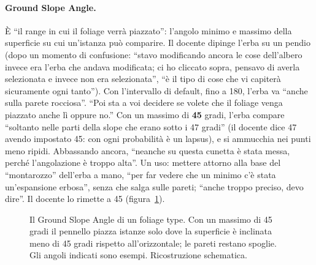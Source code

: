 \paragraph{Ground Slope Angle.} È ``il range in cui il foliage verrà piazzato'': l'angolo
minimo e massimo della superficie su cui un'istanza può comparire. Il docente dipinge l'erba
su un pendio (dopo un momento di confusione: ``stavo modificando ancora le cose dell'albero
invece era l'erba che andava modificata; ci ho cliccato sopra, pensavo di averla selezionata e
invece non era selezionata'', ``è il tipo di cose che vi capiterà sicuramente ogni tanto''). Con
l'intervallo di default, fino a 180, l'erba va ``anche sulla parete rocciosa''. ``Poi sta a voi
decidere se volete che il foliage venga piazzato anche lì oppure no.'' Con un massimo di
\textbf{45} gradi, l'erba compare ``soltanto nelle parti della slope che erano sotto i 47
gradi'' (il docente dice 47 avendo impostato 45: con ogni probabilità è un lapsus), e si
ammucchia nei punti meno ripidi. Abbassando ancora, ``neanche su questa cunetta è stata
messa, perché l'angolazione è troppo alta''. Un uso: mettere attorno alla base del
``montarozzo'' dell'erba a mano, ``per far vedere che un minimo c'è stata un'espansione
erbosa'', senza che salga sulle pareti; ``anche troppo preciso, devo dire''. Il docente lo
rimette a 45 (figura~\ref{ue15:fig:slope}).

\begin{figure}[htbp]
\centering
{}
\caption{Il Ground Slope Angle di un foliage type. Con un massimo di 45 gradi il pennello
piazza istanze solo dove la superficie è inclinata meno di 45 gradi rispetto all'orizzontale;
le pareti restano spoglie. Gli angoli indicati sono esempi. Ricostruzione schematica.}
\label{ue15:fig:slope}
\end{figure}

